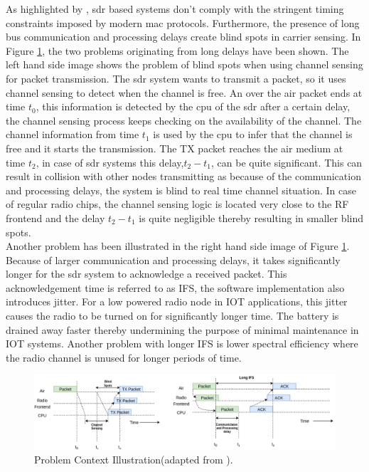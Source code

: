 As highlighted by \cite{schmid_experimental_2007}, \ac{sdr} based systems don't comply with the stringent timing constraints imposed by modern \ac{mac} protocols. Furthermore, the presence of long bus communication and processing delays create blind spots\cite{schmid_experimental_2007} in carrier sensing. 
In Figure \ref{blind_spots}, the two problems originating from long delays have been shown.
The left hand side image shows the problem of blind spots when using channel sensing for packet transmission.
The \ac{sdr} system wants to transmit a packet, so it uses channel sensing to detect when the channel is free.
An over the air packet ends at time $t_0$, this information is detected by the \ac{cpu} of the \ac{sdr} after a certain delay, the channel sensing process keeps checking on the availability of the channel.
The channel information from time $t_1$ is used by the \ac{cpu} to infer that the channel is free and it starts the transmission.
The TX packet reaches the air medium at time $t_2$, in case of \ac{sdr} systems this delay,$t_2-t_1$, can be quite significant.
This can result in collision with other nodes transmitting as because of the communication and processing delays, the system is blind to real time channel situation.
In case of regular radio chips, the channel sensing logic is located very close to the \ac{RF} frontend and the delay $t_2 - t_1$ is quite negligible thereby resulting in smaller blind spots.\\

Another problem has been illustrated in the right hand side image of Figure \ref{blind_spots}.
Because of larger communication and processing delays, it takes significantly longer for the \ac{sdr} system to acknowledge a received packet.
This acknowledgement time is referred to as \ac{IFS}, the software implementation also introduces jitter.
For a low powered radio node in \ac{IOT} applications, this jitter causes the radio to be turned on for significantly longer time.
The battery is drained away faster thereby undermining the purpose of minimal maintenance in \ac{IOT} systems.
Another problem with longer \ac{IFS} is lower spectral efficiency where the radio channel is unused for longer periods of time.\\ 

\begin{figure}[!h]
\centering
\includegraphics[width=\textwidth]{Figure/BlindSpots.png}
\caption{Problem Context Illustration(adapted from \cite{schmid_experimental_2007}).}
\label{blind_spots}
\end{figure}

